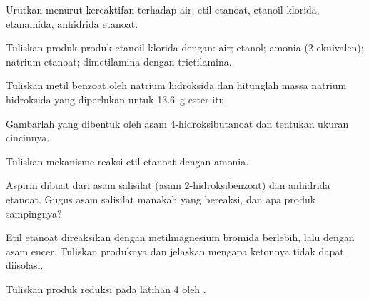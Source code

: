 \begin{exercise}[$\star$]\label{exo:b2:acyl-substitution:1}
Urutkan menurut kereaktifan terhadap air: etil etanoat, etanoil klorida,
etanamida, anhidrida etanoat.
\end{exercise}

\begin{exercise}[$\star$]\label{exo:b2:acyl-substitution:2}
Tuliskan produk-produk etanoil klorida dengan: air; etanol; amonia (2
ekuivalen); natrium etanoat; dimetilamina dengan trietilamina.
\end{exercise}

\begin{exercise}[$\star$]\label{exo:b2:acyl-substitution:3}
Tuliskan  metil benzoat oleh natrium hidroksida dan hitunglah
massa natrium hidroksida yang diperlukan untuk \qty{13.6}{g} ester itu.
\end{exercise}

\begin{exercise}[$\star$]\label{exo:b2:acyl-substitution:4}
Gambarlah  yang dibentuk oleh asam 4-hidroksibutanoat dan tentukan ukuran cincinnya.
\end{exercise}

\begin{exercise}[$\star\star$]\label{exo:b2:acyl-substitution:5}
Tuliskan mekanisme reaksi etil etanoat dengan amonia.
\end{exercise}

\begin{exercise}[$\star\star$]\label{exo:b2:acyl-substitution:6}
Aspirin dibuat dari asam salisilat (asam 2-hidroksibenzoat) dan anhidrida
etanoat. Gugus asam salisilat manakah yang bereaksi, dan apa produk
sampingnya?
\end{exercise}

\begin{exercise}[$\star\star$]\label{exo:b2:acyl-substitution:7}
Etil etanoat direaksikan dengan metilmagnesium bromida berlebih, lalu dengan
asam encer. Tuliskan produknya dan jelaskan mengapa ketonnya tidak dapat
diisolasi.
\end{exercise}

\begin{exercise}[$\star\star$]\label{exo:b2:acyl-substitution:8}
Tuliskan produk reduksi  pada latihan 4 oleh .
\end{exercise}

